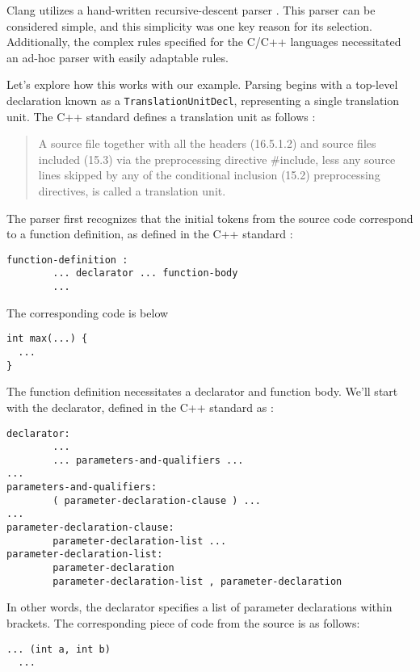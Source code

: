 Clang utilizes a hand-written recursive-descent parser
\citep{llvm:clangfeatures}. This parser can be considered simple, and this
simplicity was one key reason for its selection. Additionally, the complex rules
specified for the C/C++ languages necessitated an ad-hoc parser with easily
adaptable rules. 

Let's explore how this works with our example. Parsing begins with a top-level
declaration known as a \texttt{TranslationUnitDecl}, representing a
single translation unit. The C++ standard defines a translation unit as follows
\citep[lex.separate]{standard:cpp20}: 

\begin{quote}
A source file together with all the headers (16.5.1.2) and source files included
(15.3) via the preprocessing directive \#include, less any source lines skipped
by any of the conditional inclusion (15.2) preprocessing directives, is called a
translation unit. 
\end{quote}

The parser first recognizes that the initial tokens from the source code
correspond to a function definition, as defined in the C++ standard
\citep[dcl.fct.def.general]{standard:cpp20}: 

\begin{adjustwidth}{0em}{0em}
\begin{verbatim}
function-definition :
        ... declarator ... function-body
        ...
\end{verbatim}
\end{adjustwidth}
The corresponding code is below
\begin{verbatim}
int max(...) {
  ...
}
\end{verbatim}
The function definition necessitates a declarator and function body. We'll start
with the declarator, defined in the C++ standard as
\citep[dcl.decl.general]{standard:cpp20}: 

\begin{adjustwidth}{0em}{0em}
\begin{verbatim}
declarator:
        ...
        ... parameters-and-qualifiers ...
...
parameters-and-qualifiers:
        ( parameter-declaration-clause ) ...
...
parameter-declaration-clause:
        parameter-declaration-list ...
parameter-declaration-list:
        parameter-declaration
        parameter-declaration-list , parameter-declaration
\end{verbatim}
\end{adjustwidth}
In other words, the declarator specifies a list of parameter declarations within
brackets. The corresponding piece of code from the source is as follows: 
\begin{verbatim}
... (int a, int b) 
  ...
\end{verbatim}

